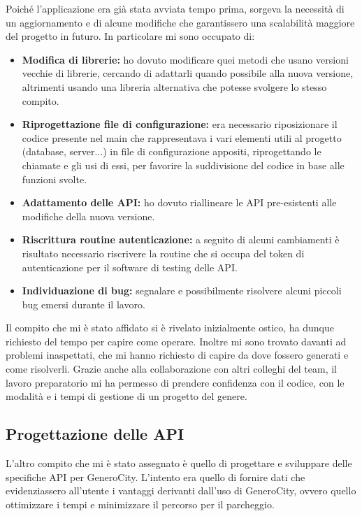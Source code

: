 \documentclass[italian, Lau, oneside, nodefaultfont, noexaminfo]{sapthesis}
\begin{document}
Poiché l'applicazione era gi\`a stata avviata tempo prima, sorgeva la necessit\`a di un aggiornamento e di alcune modifiche che garantissero una scalabilit\`a maggiore del progetto in futuro. In particolare mi sono occupato di:
\begin{itemize}
    \item \textbf{Modifica di librerie:} ho dovuto modificare quei metodi che usano versioni vecchie di librerie, cercando di adattarli quando possibile alla nuova versione, altrimenti usando una libreria alternativa che potesse svolgere lo stesso compito.
    \item \textbf{Riprogettazione file di configurazione:} era necessario riposizionare il codice presente nel main che rappresentava i vari elementi utili al progetto (database, server...) in file di configurazione appositi, riprogettando le chiamate e gli usi di essi, per favorire la suddivisione del codice in base alle funzioni svolte.
    \item \textbf{Adattamento delle API:} ho dovuto riallineare le API pre-esistenti alle modifiche della nuova versione.
    \item \textbf{Riscrittura routine autenticazione:} a seguito di alcuni cambiamenti \`e risultato necessario   riscrivere la routine che si occupa del token di autenticazione per il software di testing delle API. 
    \item \textbf{Individuazione di bug:} segnalare e possibilmente risolvere alcuni piccoli bug emersi durante il lavoro. 
\end{itemize}

Il compito che mi \`e stato affidato  si \`e rivelato inizialmente ostico, ha dunque  richiesto del tempo  per capire come operare. Inoltre mi sono trovato davanti ad problemi inaspettati, che mi hanno richiesto di  capire da dove fossero generati e come risolverli. Grazie anche alla collaborazione con  altri colleghi del team, il lavoro preparatorio mi ha permesso di prendere confidenza con il codice,  con le modalit\`a e i tempi di gestione di un progetto del genere.

\subsection{Progettazione delle API}
\label{sec:prog-api}

L'altro compito che mi è stato assegnato \`e quello di progettare e sviluppare delle specifiche API per GeneroCity. L'intento era quello di fornire dati che evidenziassero all'utente i vantaggi derivanti dall'uso di GeneroCity, ovvero quello ottimizzare i tempi e minimizzare il percorso per il parcheggio.
\end{document}
